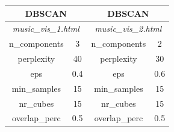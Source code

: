 \documentclass[12pt]{article}
\begin{document}
\begin{table}[H]
	\centering
\begin{tabular}{|c|c|c|c|}
	\hline
	\multicolumn{2}{c}{DBSCAN} & \multicolumn{2}{c}{DBSCAN}\\ \hline
	\multicolumn{2}{c}{\textit{music\_vis\_1.html}} & \multicolumn{2}{c}{\textit{music\_vis\_2.html}}\\ \hline
n\_components & 3 & n\_components & 2\\\hline
perplexity & 40 & perplexity & 30\\\hline
eps & 0.4 & eps & 0.6\\\hline
min\_samples & 15 & min\_samples & 15\\\hline
nr\_cubes & 15 & nr\_cubes & 15\\\hline
overlap\_perc & 0.5 & overlap\_perc & 0.5\\\hline

\end{tabular}
\end{table}
\end{document}
